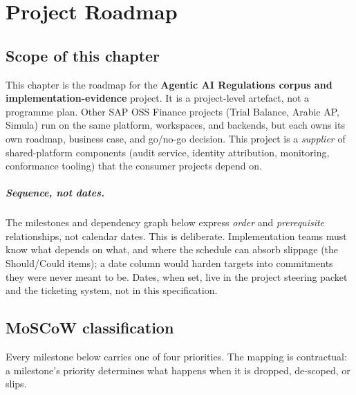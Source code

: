 \chapter{Project Roadmap}\label{ch:reg-roadmap}

\section*{Scope of this chapter}

This chapter is the roadmap for the \textbf{Agentic AI Regulations
corpus and implementation-evidence} project. It is a project-level
artefact, not a programme plan. Other SAP OSS Finance projects (Trial
Balance, Arabic AP, Simula) run on the same platform, workspaces, and
backends, but each owns its own roadmap, business case, and go/no-go
decision. This project is a \emph{supplier} of shared-platform
components (audit service, identity attribution, monitoring,
conformance tooling) that the consumer projects depend on.

\paragraph{Sequence, not dates.}
The milestones and dependency graph below express \emph{order} and
\emph{prerequisite} relationships, not calendar dates. This is
deliberate. Implementation teams must know what depends on what, and
where the schedule can absorb slippage (the Should/Could items); a
date column would harden targets into commitments they were never
meant to be. Dates, when set, live in the project steering packet and
the ticketing system, not in this specification.

\section{MoSCoW classification}\label{sec:reg-moscow}

Every milestone below carries one of four priorities. The mapping is
contractual: a milestone's priority determines what happens when it is
dropped, de-scoped, or slips.

